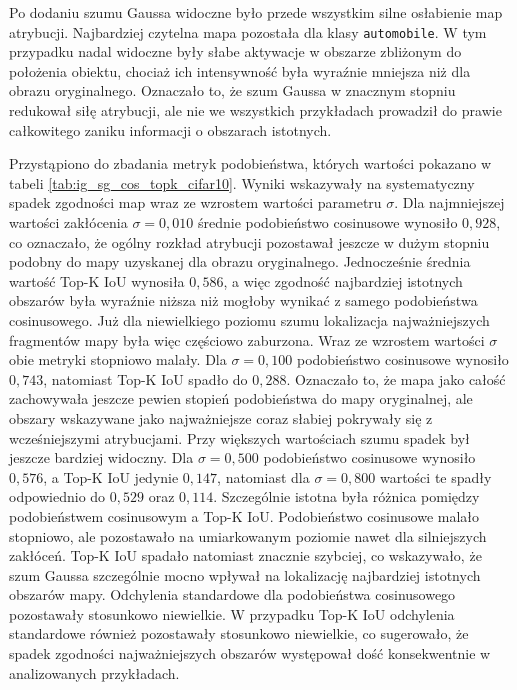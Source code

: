 \noindent Po dodaniu szumu Gaussa widoczne było przede wszystkim silne osłabienie map atrybucji.
Najbardziej czytelna mapa pozostała dla klasy \texttt{automobile}. W tym przypadku nadal widoczne były słabe aktywacje w obszarze zbliżonym do położenia obiektu, chociaż ich intensywność była wyraźnie mniejsza niż dla obrazu oryginalnego. Oznaczało to, że szum Gaussa w znacznym stopniu redukował siłę atrybucji, ale nie we wszystkich przykładach prowadził do prawie całkowitego zaniku informacji o obszarach istotnych.

Przystąpiono do zbadania metryk podobieństwa, których wartości pokazano w tabeli \ref{tab:ig_sg_cos_topk_cifar10}. Wyniki wskazywały na systematyczny spadek zgodności map wraz ze wzrostem wartości parametru $\sigma$.
Dla najmniejszej wartości zakłócenia $\sigma = 0{,}010$ średnie podobieństwo cosinusowe wynosiło $0{,}928$, co oznaczało, że ogólny rozkład atrybucji pozostawał jeszcze w dużym stopniu podobny do mapy uzyskanej dla obrazu oryginalnego. Jednocześnie średnia wartość Top-K IoU wynosiła $0{,}586$, a więc zgodność najbardziej istotnych obszarów była wyraźnie niższa niż mogłoby wynikać z samego podobieństwa cosinusowego. Już dla niewielkiego poziomu szumu lokalizacja najważniejszych fragmentów mapy była więc częściowo zaburzona.
Wraz ze wzrostem wartości $\sigma$ obie metryki stopniowo malały. Dla $\sigma = 0{,}100$ podobieństwo cosinusowe wynosiło $0{,}743$, natomiast Top-K IoU spadło do $0{,}288$. Oznaczało to, że mapa jako całość zachowywała jeszcze pewien stopień podobieństwa do mapy oryginalnej, ale obszary wskazywane jako najważniejsze coraz słabiej pokrywały się z wcześniejszymi atrybucjami. Przy większych wartościach szumu spadek był jeszcze bardziej widoczny. Dla $\sigma = 0{,}500$ podobieństwo cosinusowe wynosiło $0{,}576$, a Top-K IoU jedynie $0{,}147$, natomiast dla $\sigma = 0{,}800$ wartości te spadły odpowiednio do $0{,}529$ oraz $0{,}114$.
Szczególnie istotna była różnica pomiędzy podobieństwem cosinusowym a Top-K IoU. Podobieństwo cosinusowe malało stopniowo, ale pozostawało na umiarkowanym poziomie nawet dla silniejszych zakłóceń. Top-K IoU spadało natomiast znacznie szybciej, co wskazywało, że szum Gaussa szczególnie mocno wpływał na lokalizację najbardziej istotnych obszarów mapy. Odchylenia standardowe dla podobieństwa cosinusowego pozostawały stosunkowo niewielkie. W przypadku Top-K IoU odchylenia standardowe również pozostawały stosunkowo niewielkie, co sugerowało, że spadek zgodności najważniejszych obszarów występował dość konsekwentnie w analizowanych przykładach.

